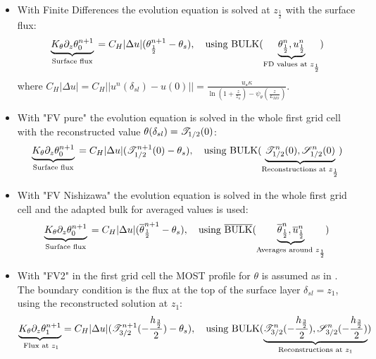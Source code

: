 \begin{itemize}
	\item With Finite Differences the evolution equation is
		solved at $z_{\frac{1}{2}}$ with the surface flux:
		\begin{equation}
			\underbrace{K_\theta
			\partial_z \theta_0^{n+1}}_{\text{
				Surface flux
			}} =
			C_H|\Delta u|(
			\theta_{\frac{1}{2}}^{n+1} - \theta_s),
			~~~ \text{using } {\rm BULK}
			(\underbrace{\theta_{\frac{1}{2}}^{n},
			u_{\frac{1}{2}}^{n}}_{
				\text{FD values at } z_{\frac{1}{2}}
			})
		\end{equation}
		where 
$C_H|\Delta u| = C_H||u^n(\delta_{sl})- u(0)|| = 
\frac{u_\star \kappa}{\ln\left(1+\frac{z}{z_{u}}\right)
    - \psi_\theta\left(\frac{z}{L_{MO}}\right) }$.

	\item With "FV pure" the evolution equation is solved in 
		the whole first grid cell with the reconstructed
		value $\theta(\delta_{sl}) = {\cal T}_{1/2}(0)$:
		\begin{equation}
			\underbrace{K_\theta
			\partial_z \theta_0^{n+1}}_{\text{
				Surface flux
			}} =
			C_H|\Delta u|({\cal T}_{1/2}^{n+1}(0)
			- \theta_s),
			~~~ \text{using } {\rm BULK}
			(\underbrace{{\cal T}_{1/2}^{n}(0),
			{\cal S}_{1/2}^{n}(0)}_{
			\text{Reconstructions at } z_{\frac{1}{2}}
			})
		\end{equation}
	\item With "FV Nishizawa" the evolution equation is solved in
		the whole first grid cell and the adapted bulk
		for averaged values is used:
		\begin{equation}
			\underbrace{K_\theta
			\partial_z \theta_0^{n+1}}_{\text{
				Surface flux
			}} =
			C_H|\Delta u| (
			\overline{\theta}_{\frac{1}{2}}^{n+1}
			- \theta_s),
			~~~ \text{using } \overline{\rm BULK}
			(\underbrace{\overline{\theta}_{\frac{1}{2}}^{n},
			\overline{u}_{\frac{1}{2}}^{n}}_{
			\text{Averages around } z_\frac{1}{2}})
		\end{equation}
	\item With "FV2" in the first grid cell
		the MOST profile for $\theta$ is assumed as in
		\cite{nishizawa_surface_2018}.
		The boundary condition is the flux at the top of the
		surface layer $\delta_{sl}=z_1$,
		using the reconstructed solution at $z_1$:
		\begin{equation}
			\underbrace{K_\theta
			\partial_z \theta^{n+1}_1}_{\text{
				Flux at
			} z_1} =
			C_H|\Delta u|(
			{\cal T}_{3/2}^{n+1}
			(-\frac{h_\frac{3}{2}}{2}) - \theta_s),
			~~~ \text{using } {\rm BULK}
			(\underbrace{{\cal T}_{3/2}^{n}
			(-\frac{h_\frac{3}{2}}{2}),
			{\cal S}_{3/2}^{n}
			(-\frac{h_\frac{3}{2}}{2})}_{
			\text{Reconstructions at } z_1 })
		\end{equation}
\end{itemize}

